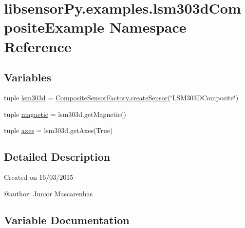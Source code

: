 \hypertarget{namespacelibsensorPy_1_1examples_1_1lsm303dCompositeExample}{}\section{libsensor\+Py.\+examples.\+lsm303d\+Composite\+Example Namespace Reference}
\label{namespacelibsensorPy_1_1examples_1_1lsm303dCompositeExample}
\subsection*{Variables}
\begin{DoxyCompactItemize}
\item 
tuple \hyperlink{namespacelibsensorPy_1_1examples_1_1lsm303dCompositeExample_a1bb1ae50f2def88d8dd32ee9a396ee93}{lsm303d} = \hyperlink{classconcretefactory_1_1compositeSensorFactory_1_1CompositeSensorFactory_a2d3860525907a2f2d37c98163150ea03}{Composite\+Sensor\+Factory.\+create\+Sensor}(\char`\"{}L\+S\+M303\+D\+Composite\char`\"{})
\item 
tuple \hyperlink{namespacelibsensorPy_1_1examples_1_1lsm303dCompositeExample_ab929728d12d6267ec719a914d63ecef3}{magnetic} = lsm303d.\+get\+Magnetic()
\item 
tuple \hyperlink{namespacelibsensorPy_1_1examples_1_1lsm303dCompositeExample_a887c2a6fed9f7e9ca41112dc9a2fef27}{axes} = lsm303d.\+get\+Axes(True)
\end{DoxyCompactItemize}


\subsection{Detailed Description}
\begin{DoxyVerb}Created on 16/03/2015

@author: Junior Mascarenhas
\end{DoxyVerb}
 

\subsection{Variable Documentation}
\hypertarget{namespacelibsensorPy_1_1examples_1_1lsm303dCompositeExample_a887c2a6fed9f7e9ca41112dc9a2fef27}{}

